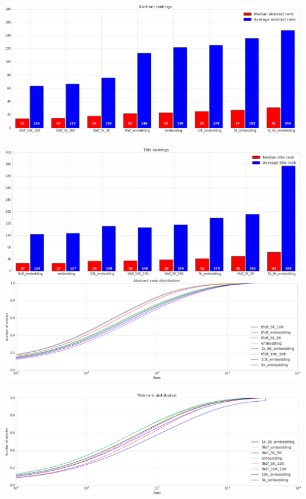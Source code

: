 \documentclass[../../Thesis.tex]{subfiles}
\begin{document}
\includegraphics[width=6in]{Plots/Abstract_rankings}\\
\\
\includegraphics[width=6in]{Plots/Title_rankings}\\
\includegraphics[width=6in]{Plots/Abstract_rank_distribution}\\
\\
\includegraphics[width=6in]{Plots/Title_rank_distribution}\\
\end{document}

